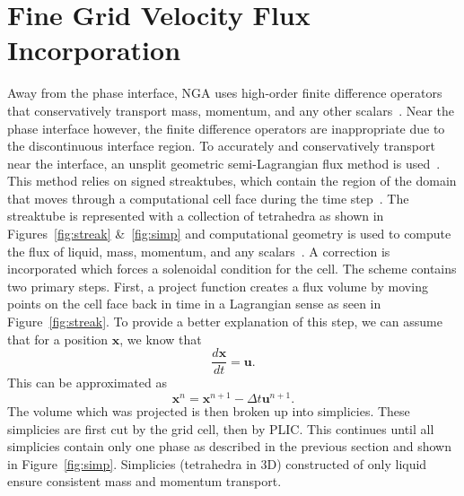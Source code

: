 \section*{Fine Grid Velocity Flux  Incorporation} 
Away from the phase interface, NGA uses high-order finite difference operators that conservatively transport mass, momentum, and any other scalars~\cite{NGA2}.  Near the phase interface however, the finite difference operators are inappropriate due to the discontinuous interface region.  To accurately and conservatively transport near the interface, an unsplit geometric semi-Lagrangian flux method is used~\cite{Owkes2017,Owkes2014}. This method relies on signed streaktubes, which contain the region of the domain that moves through a computational cell face during the time step~\cite{Owkes2017}.  The streaktube is represented with a collection of tetrahedra as shown in Figures~\ref{fig:streak} \&~\ref{fig:simp} and computational geometry is used to compute the flux of liquid, mass, momentum, and any scalars~\cite{Owkes2017}. A correction is incorporated which forces a solenoidal condition for the cell. The scheme contains two primary steps. First, a project function creates a flux volume by moving points on the cell face back in time in a Lagrangian sense as seen in Figure~\ref{fig:streak}. To provide a better explanation of this step, we can assume  that for a position $\bm{x}$, we know that 
\begin{equation}
\frac{d \bm{x}}{d t} = \bm{u}.
\end{equation} 
This can be approximated as 
\begin{equation}
\bm{x}^n = \bm{x}^{n+1} - \Delta t \bm{u}^{n+1}.
\end{equation} The volume which was projected is then broken up into simplicies. These simplicies are first cut by the grid cell, then by PLIC. This continues until all simplicies contain only one phase as described in the previous section and shown in Figure~\ref{fig:simp}. Simplicies (tetrahedra in 3D)  constructed of only liquid ensure consistent mass and momentum transport. 

